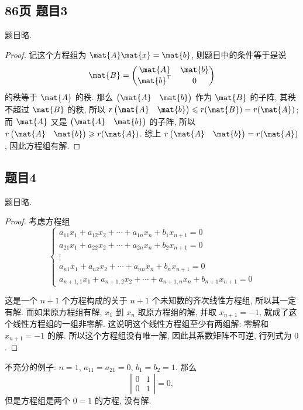\newpage
\subsection*{86页 题目3}
题目略.
\begin{proof}
    记这个方程组为 $\mat{A}\mat{x} = \mat{b}$, 则题目中的条件等于是说
    \[\mat{B} = 
    \begin{pmatrix}
        \mat{A} & \mat{b} \\
        \mat{b}^\top & 0
    \end{pmatrix}
    \]
    的秩等于 $\mat{A}$ 的秩. 那么 $\begin{pmatrix} \mat{A} & \mat{b} \end{pmatrix}$ 作为 $\mat{B}$ 的子阵, 其秩不超过 $\mat{B}$ 的秩, 所以 $r\begin{pmatrix} \mat{A} & \mat{b} \end{pmatrix} \leqslant r(\mat{B}) = r(\mat{A})$; 而 $\mat{A}$ 又是 $\begin{pmatrix} \mat{A} & \mat{b} \end{pmatrix}$ 的子阵, 所以 $r\begin{pmatrix} \mat{A} & \mat{b} \end{pmatrix} \geqslant r(\mat{A})$. 综上 $r\begin{pmatrix} \mat{A} & \mat{b} \end{pmatrix} = r(\mat{A})$, 因此方程组有解.
\end{proof}

\subsection*{题目4}
题目略.
\begin{proof}
    考虑方程组
    \[
        \left\{
        \begin{aligned}
            a_{11} x_1 + a_{12} x_2 + \cdots + a_{1n} x_n + b_1 x_{n+1} = 0 \\
            a_{21} x_1 + a_{22} x_2 + \cdots + a_{2n} x_n + b_2 x_{n+1} = 0 \\
            \vdots \\
            a_{n1} x_1 + a_{n2} x_2 + \cdots + a_{nn} x_n + b_n x_{n+1} = 0 \\
            a_{n+1, 1} x_1 + a_{n+1, 2} x_2 + \cdots + a_{n+1, n} x_n + b_{n+1} x_{n+1} = 0
        \end{aligned}
        \right.
    \]

    这是一个 $n + 1$ 个方程构成的关于 $n + 1$ 个未知数的齐次线性方程组, 所以其一定有解. 而如果原方程组有解, $x_1$ 到 $x_n$ 取原方程组的解, 并取 $x_{n + 1} = -1$, 就成了这个线性方程组的一组非零解. 这说明这个线性方程组至少有两组解: 零解和 $x_{n + 1} = -1$ 的解. 所以这个方程组没有唯一解, 因此其系数矩阵不可逆, 行列式为 $0$.
\end{proof}
不充分的例子: $n = 1$, $a_{11} = a_{21} = 0$, $b_1 = b_2 = 1$. 那么
\[
\left|\begin{matrix}
    0 & 1 \\ 0 & 1
\end{matrix}\right| = 0,
\]
但是方程组是两个 $0 = 1$ 的方程, 没有解.

